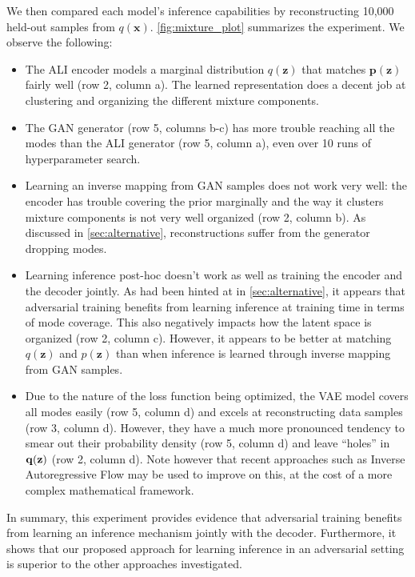 \documentclass{article}
\begin{document}
We then compared each model’s inference capabilities by reconstructing 10,000
held-out samples from $q(\bm{x})$. \autoref{fig:mixture_plot} summarizes the
experiment. We observe the following:
\begin{itemize}
    \item The ALI encoder models a marginal distribution $q(\bm{z})$ that
        matches $\bm{p(z)}$ fairly well (row 2, column a). The learned
        representation does a decent job at clustering and organizing the
        different mixture components.
    \item The GAN generator (row 5, columns b-c) has more trouble reaching all
        the modes than the ALI generator (row 5, column a), even over 10 runs of
        hyperparameter search.
    \item Learning an inverse mapping from GAN samples does not work very well:
        the encoder has trouble covering the prior marginally and the way it
        clusters mixture components is not very well organized (row 2, column
        b). As discussed in \autoref{sec:alternative}, reconstructions suffer
        from the generator dropping modes.
    \item Learning inference post-hoc doesn't work as well as training the
        encoder and the decoder jointly. As had been hinted at in
        \autoref{sec:alternative}, it appears that adversarial training benefits
        from learning inference at training time in terms of mode coverage. This
        also negatively impacts how the latent space is organized (row 2, column
        c). However, it appears to be better at matching $q(\bm{z})$ and
        $p(\bm{z})$ than when inference is learned through inverse mapping from
        GAN samples.
    \item Due to the nature of the loss function being optimized, the VAE model
        covers all modes easily (row 5, column d) and excels at reconstructing
        data samples (row 3, column d). However, they have a much more
        pronounced tendency to smear out their probability density (row 5,
        column d) and leave ``holes'' in $\bf{q(z)}$ (row 2, column d). Note
        however that recent approaches such as Inverse Autoregressive Flow
        \citep{kingma2016improving} may be used to improve on this, at the cost
        of a more complex mathematical framework.
\end{itemize}

In summary, this experiment provides evidence that adversarial training benefits
from learning an inference mechanism jointly with the decoder.  Furthermore, it
shows that our proposed approach for learning inference in an adversarial
setting is superior to the other approaches investigated.
\end{document}
